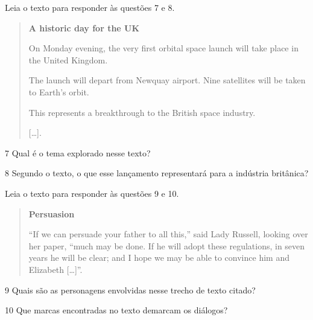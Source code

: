 Leia o texto para responder às questões 7 e 8.

\begin{quote}
\textbf{A historic day for the UK}

On Monday evening, the very first orbital space launch will take place in the United Kingdom.

The launch will depart from Newquay airport. Nine satellites will be taken to Earth’s orbit.

This represents a breakthrough to the British space industry.

{[}\ldots{}{]}.

\end{quote}

\num{7} Qual é o tema explorado nesse texto?



\num{8} Segundo o texto, o que esse lançamento representará para a indústria britânica?



Leia o texto para responder às questões 9 e 10.

\begin{quote}
\textbf{Persuasion}

``If we can persuade your father to all this,'' said Lady Russell,
looking over her paper, ``much may be done. If he will adopt these
regulations, in seven years he will be clear; and I hope we may be able
to convince him and Elizabeth {[}\ldots{}{]}''.

\end{quote}

\num{9} Quais são as personagens envolvidas nesse trecho de texto citado?



\num{10} Que marcas encontradas no texto demarcam os diálogos?


